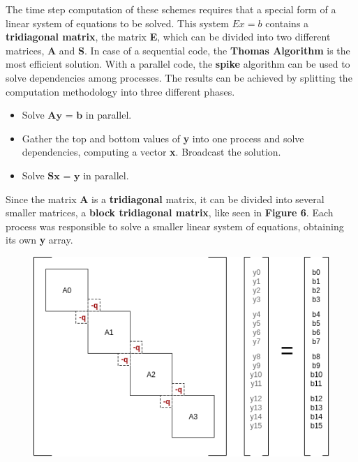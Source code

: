 \documentclass[12pt]{article}
\begin{document}
The time step computation of these schemes requires that a special form of a linear system of equations to be solved. This system $Ex = b$ contains a \textbf{tridiagonal matrix}, the matrix \textbf{E}, which can be divided into two different matrices, \textbf{A} and \textbf{S}\cite{spike}. In case of a sequential code, the \textbf{Thomas Algorithm} is the most efficient solution. With a parallel code, the \textbf{spike} algorithm can be used to solve dependencies among processes. The results can be achieved by splitting the computation methodology into three different phases.

\begin{itemize}[noitemsep] 
\item Solve $\textbf{Ay = b}$ in parallel.
\item Gather the top and bottom values of \textbf{y} into one process and solve dependencies, computing a vector \textbf{x}. Broadcast the solution.
\item Solve $\textbf{Sx = y}$ in parallel.
\end{itemize}

\par Since the matrix \textbf{A} is a \textbf{tridiagonal} matrix, it can be divided into several smaller matrices, a \textbf{block tridiagonal matrix}\cite{chang}, like seen in \textbf{Figure 6}. Each process was responsible to solve a smaller linear system of equations, obtaining its own \textbf{y} array.
\newline
\begin{figure}[!htb]
  \centering
  \includegraphics[width=.55\linewidth]{spikedivision.png}
\end{figure}
\end{document}
